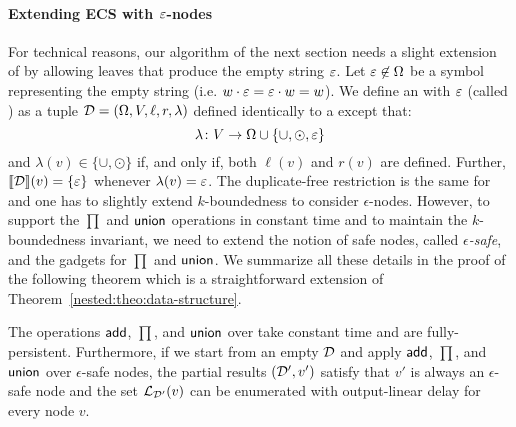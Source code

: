 \paragraph{Extending ECS with $\varepsilon$-nodes}
For technical reasons, our algorithm of the next section needs a slight extension of \dsabbr{} by allowing leaves that produce the empty string $\varepsilon$. Let $\varepsilon\not\in\Omega$ be a symbol representing the empty string (i.e. $w\cdot\varepsilon = \varepsilon\cdot w = w$). We define an \dsname{} with $\varepsilon$ (called \dsepsabbr) as a tuple $\mathcal{D} = (\Omega, V, \ell, r, \lambda)$ defined identically to a \dsabbr{} except that:
\[
\lambda\colon V\to\Omega\cup\{\cup, \odot,\varepsilon\}
\] 
and $\lambda(v)\in\{\cup,\odot\}$ if, and only if, both $\ell(v)$ and $r(v)$ are defined. Further, ${\llbracket{\mathcal{D}}\rrbracket}(v) = \{\varepsilon\}$ whenever $\lambda(v) = \varepsilon$. The duplicate-free restriction is the same for \dsepsabbr and one has to slightly extend $k$-boundedness to consider $\epsilon$-nodes. %
However, to support the $\prod$ and $\mathsf{union}$ operations in constant time and to maintain the $k$-boundedness invariant, we need to extend the notion of safe nodes, called \emph{$\epsilon$-safe}, and the gadgets for $\prod$ and $\mathsf{union}$. We summarize all these details in the proof of the following theorem which is a straightforward extension of Theorem~\ref{nested:theo:data-structure}.

 
\begin{theorem}\label{nested:theo:data-structure-eps}
	The operations $\mathsf{add}$, $\prod$, and $\mathsf{union}$ over \dsepsabbr{} take constant time and are fully-persistent. Furthermore, if we start from an empty \dsepsabbr{} $\mathcal{D}$ and apply $\mathsf{add}$, $\prod$, and $\mathsf{union}$ over $\epsilon$-safe nodes, the partial results $(\mathcal{D}', v')$ satisfy that $v'$ is always an $\epsilon$-safe node and the set $\mathcal{L}_{\mathcal{D}'}(v)$ can be enumerated with output-linear delay for every node $v$.
\end{theorem}  





	




